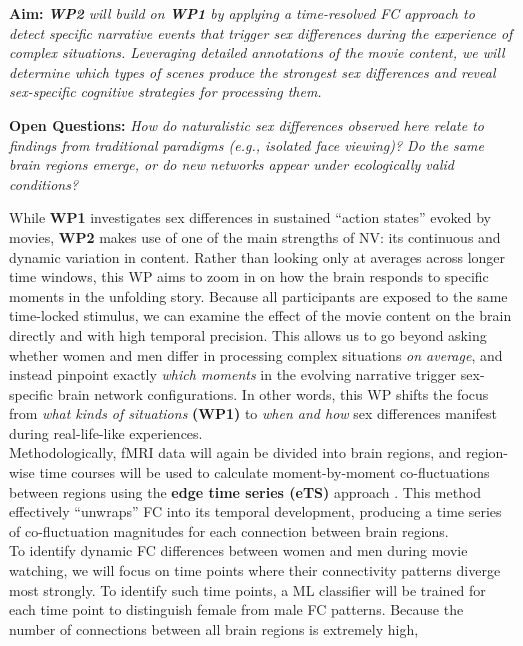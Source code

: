 \documentclass[11pt,a4paper]{article}
\begin{document}
\textbf{Aim:} \textit{\textbf{WP2} will build on \textbf{WP1} by applying a time-resolved FC approach to detect specific narrative events 
that trigger sex differences during the experience of complex situations. Leveraging detailed annotations of the movie content,
we will determine which types of scenes produce the strongest sex differences and reveal sex-specific cognitive strategies 
for processing them.}

\textbf{Open Questions:} \textit{How do naturalistic sex differences observed here relate to findings 
from traditional paradigms (e.g., isolated face viewing)? Do the same brain regions emerge, 
or do new networks appear under ecologically valid conditions?}  

While \textbf{WP1} investigates sex differences in sustained “action states” evoked by movies, 
\textbf{WP2} makes use of one of the main strengths of NV: its continuous and dynamic variation in content. 
Rather than looking only at averages across longer time windows, this WP aims to zoom in on how the brain responds 
to specific moments in the unfolding story. 
Because all participants are exposed to the same time-locked stimulus, we can examine the effect of the movie 
content on the brain directly and with high temporal precision. This allows us to go beyond asking whether women and 
men differ in processing complex situations \textit{on average}, and instead pinpoint exactly \textit{which moments} in the 
evolving narrative trigger sex-specific brain network configurations. 
In other words, this WP shifts the focus from \textit{what kinds of situations} \textbf{(WP1)} to 
\textit{when and how} sex differences manifest during real-life-like experiences.\\
Methodologically, fMRI data will again be divided into brain regions, and region-wise time courses 
will be used to calculate moment-by-moment co-fluctuations between regions using the \textbf{edge time series (eTS)} 
approach \parencite{betzelLivingEdgeNetwork2023,faskowitzEdgecentricFunctionalNetwork2020a}. 
This method effectively “unwraps” FC into its temporal development, producing a time series of co-fluctuation magnitudes 
for each connection between brain regions.\\
To identify dynamic FC differences between women and men during movie watching, we will focus on time points where 
their connectivity patterns diverge most strongly. To identify such time points, a ML classifier will be trained for each
time point to distinguish female from male FC patterns. Because the number of connections between all brain regions is extremely high, 
\end{document}
